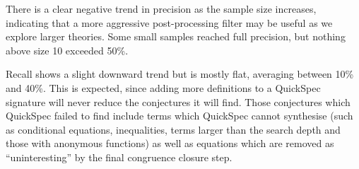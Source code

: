There is a clear negative trend in precision as the sample size increases,
indicating that a more aggressive post-processing filter may be useful as we
explore larger theories. Some small samples reached full precision, but nothing
above size 10 exceeded 50\%.

Recall shows a slight downward trend but is mostly flat, averaging between 10\%
and 40\%. This is expected, since adding more definitions to a QuickSpec
signature will never reduce the conjectures it will find. Those conjectures
which QuickSpec failed to find include terms which QuickSpec cannot synthesise
(such as conditional equations, inequalities, terms larger than the search depth
and those with anonymous functions) as well as equations which are removed as
``uninteresting'' by the final congruence closure step.






